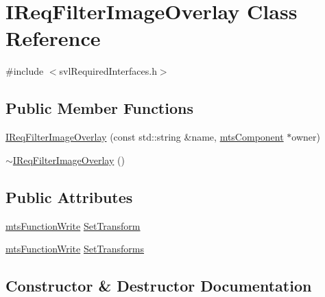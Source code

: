 \hypertarget{class_i_req_filter_image_overlay}{}\section{I\+Req\+Filter\+Image\+Overlay Class Reference}
\label{class_i_req_filter_image_overlay}


{\ttfamily \#include $<$svl\+Required\+Interfaces.\+h$>$}

\subsection*{Public Member Functions}
\begin{DoxyCompactItemize}
\item 
\hyperlink{class_i_req_filter_image_overlay_acbe18271dd5b8a5c89dc4061bf4f374b}{I\+Req\+Filter\+Image\+Overlay} (const std\+::string \&name, \hyperlink{classmts_component}{mts\+Component} $\ast$owner)
\item 
\hyperlink{class_i_req_filter_image_overlay_a136c2fcb8b04d7b91468810e38b38584}{$\sim$\+I\+Req\+Filter\+Image\+Overlay} ()
\end{DoxyCompactItemize}
\subsection*{Public Attributes}
\begin{DoxyCompactItemize}
\item 
\hyperlink{classmts_function_write}{mts\+Function\+Write} \hyperlink{class_i_req_filter_image_overlay_aea8a378df3af93768b3ffd3c6eb9ad2e}{Set\+Transform}
\item 
\hyperlink{classmts_function_write}{mts\+Function\+Write} \hyperlink{class_i_req_filter_image_overlay_a23171709938c0c03dfe317aca65bb75b}{Set\+Transforms}
\end{DoxyCompactItemize}


\subsection{Constructor \& Destructor Documentation}
\hypertarget{class_i_req_filter_image_overlay_acbe18271dd5b8a5c89dc4061bf4f374b}{}
